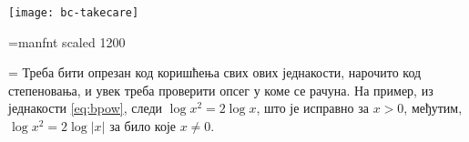 \newcommand\takecare{\texttt{[image: bc-takecare]}}%
\robustify\takecare

\font\manfnt=manfnt scaled 1200 %
\def\dbend{{\manfnt\char126\relax}}
\def\danger{\hangindent=\parindent 
\hangafter=-2 \noindent\leavevmode
\smash{\hbox to 0pt{\kern-\hangindent\lower1.2pt\hbox{\dbend}\hss}}%
}


\danger\label{danger}%
Треба бити опрезан код коришћења свих ових једнакости, нарочито код степеновања,
и увек треба проверити опсег у коме се рачуна.
На пример, из једнакости \eqref{eq:bpow}, следи $\log x^2=2\log x$, што је исправно за $x>0$,
међутим, $\log x^2=2\log|x|$ за било које $x\ne0$. 
